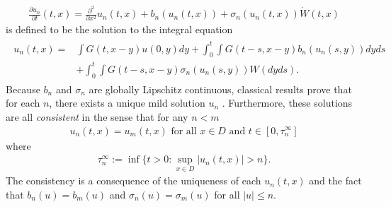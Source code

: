 \documentclass[12pt]{article}
\numberwithin{equation}{section}
\begin{document}
\begin{align}
     \frac{\partial u_n}{\partial t}(t,x)=\frac{\partial^2}{\partial x^2} u_n(t,x)+b_n(u_n(t,x))+\sigma_n(u_n(t,x))\dot{W}(t,x)\label{eq:SPDE of cutoff}
\end{align}
is defined to be the solution to the integral equation
\begin{align}
    \begin{split}
        u_n(t,x)=&\int G(t,x-y)u(0,y)dy+\int_0^t\int G(t-s,x-y)b_n(u_n(s,y))dyds\\
        &+\int_0^t\int G(t-s,x-y)\sigma_n(u_n(s,y))W(dyds).
    \end{split}\label{eq:integral equation of cutoff}
\end{align}
Because $b_n$ and $\sigma_n$ are globally Lipschitz continuous, classical results prove that for each $n$, there exists a unique mild solution $u_n$ \cite{DaPrato_Zabczyk_2014,Dalang1999}. Furthermore, these solutions are all \textit{consistent} in the sense that for any $n<m$
\begin{align}
    u_n(t,x)=u_m(t,x)\text{ for all }x\in D\text{ and }t\in[0,\tau_n^\infty]\label{eq:consistency}
\end{align}
where
\begin{align}
    \tau_n^\infty:=\inf\Big\{t>0:\sup_{x\in D}|u_n(t,x)|>n\Big\}.\label{def:tau_n}
\end{align}
The consistency is a consequence of the uniqueness of each $u_n(t,x)$ and the fact that $b_n(u)=b_m(u)$ and $\sigma_n(u)=\sigma_m(u)$ for all $|u|\leq n$.
\end{document}
